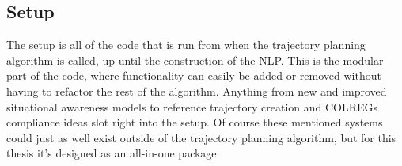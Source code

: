 \subsection{Setup}

The setup is all of the code that is run from when the trajectory planning algorithm is called, up until the construction of the \gls{NLP}.
This is the modular part of the code, where functionality can easily be added or removed without having to refactor
the rest of the algorithm. Anything from new and improved situational awareness models to reference trajectory creation and
COLREGs compliance ideas slot right into the setup. Of course these mentioned systems could just as well exist outside of the
trajectory planning algorithm, but for this thesis it's designed as an all-in-one package.

